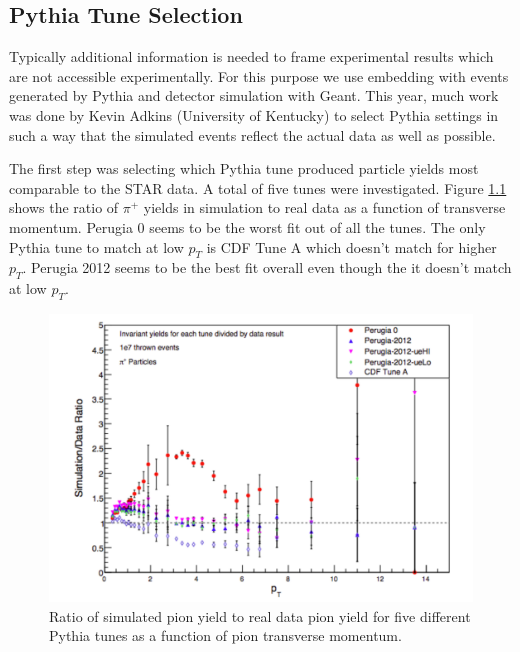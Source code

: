 \documentclass[letterpaper, abstract = on,listof=totoc, bibliography=totoc]{scrreprt}
\begin{document}
\begin{appendices}
\chapter{Pythia Tune Selection}

Typically additional information is needed to frame experimental results which are not accessible experimentally. For this purpose we use embedding with events generated by  Pythia and detector simulation with Geant. This year, much work was done by Kevin Adkins (University of Kentucky) to select Pythia settings in such a way that the simulated events reflect the actual data as well as possible. 

%
%
%

The first step was selecting which Pythia tune produced particle yields most comparable to the STAR data. A total of five tunes were investigated. Figure \ref{fig:piPlusPythTunes} shows the ratio of $\pi^+$ yields in simulation to real data as a function of transverse momentum. Perugia 0 seems to be the worst fit out of all the tunes. The only Pythia tune to match at low $p_T$ is CDF Tune A which doesn't match for higher $p_T$. Perugia 2012 seems to be the  best fit overall even though the it doesn't match at low $p_T$. 

\begin{figure}
\begin{center}
\includegraphics[width = .77\textwidth]{piPlusPythTunes}
\caption[]{Ratio of simulated pion yield to real data pion yield for five different Pythia tunes as a function of pion transverse momentum.}
\label{fig:piPlusPythTunes}
\end{center}
\end{figure}


\end{appendices}
\end{document}
